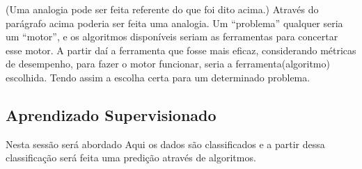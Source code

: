 (Uma analogia pode ser feita referente do que foi dito acima.) Através do parágrafo acima poderia ser feita uma analogia. Um “problema” qualquer seria um “motor”, e os algoritmos disponíveis seriam as ferramentas para concertar esse motor. A partir daí a ferramenta que fosse mais eficaz, considerando métricas de desempenho, para fazer o motor funcionar, seria a ferramenta(algoritmo) escolhida. Tendo assim a escolha certa para um determinado problema.

\subsection{Aprendizado Supervisionado}\label{ssec:aprendSup}

Nesta sessão será abordado Aqui os dados são classificados e a partir dessa classificação será feita uma predição através de algoritmos.



